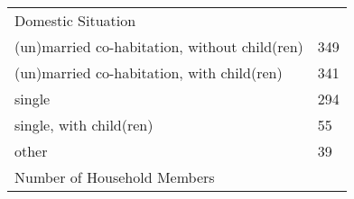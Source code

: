 \documentclass{article}
\begin{document}
\begin{table}[h]
\begin{tabular}{ll}
Domestic Situation                                                                  &        \\
(un)married co-habitation, without child(ren)                                   & 349    \\
(un)married co-habitation, with child(ren)                                      & 341    \\
single                                                                          & 294    \\
single, with child(ren)                                                         & 55     \\
other                                                                           & 39     \\ \hline
Number of Household Members                                                                     &        \\


\end{tabular}
\end{table}
\end{document}
